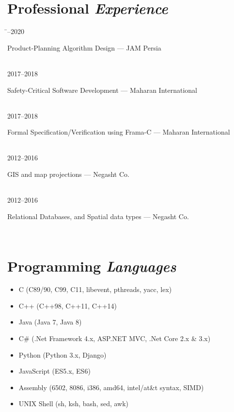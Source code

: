 \documentclass[a4paper,10pt]{article}
\newcommand{\follownote}[1]{--- {\footnotesize\color{darkblue}#1}}
\begin{document}
\section*{{\color{red}Professional \emph{Experience}}}
\begin{tabbing}
\hspace{2.5cm}\=--2020 \>\parbox[t]{10.5cm}{
	Product-Planning Algorithm Design
	\follownote{JAM Persia}
} \\[2mm]
2017--2018 \>\parbox[t]{10.5cm}{
	Safety-Critical Software Development
	\follownote{Maharan International}
} \\[2mm]
2017--2018 \>\parbox[t]{10.5cm}{
	Formal Specification/Verification using Frama-C
	\follownote{Maharan International}
} \\[2mm]
2012--2016 \>\parbox[t]{10.5cm}{
	GIS and map projections
	\follownote{Negasht Co.}
} \\[2mm]
2012--2016 \>\parbox[t]{10.5cm}{
	Relational Databases, and Spatial data types
	\follownote{Negasht Co.}
} \\[2mm]
\end{tabbing}

\section*{{\color{purple}Programming \emph{Languages}}}
\begin{itemize}
	\item C (C89/90, C99, C11, libevent, pthreads, yacc, lex)
	\item C++ (C++98, C++11, C++14)
	\item Java (Java 7, Java 8)
	\item C\# (.Net Framework 4.x, ASP.NET MVC, .Net Core 2.x \& 3.x)
	\item Python (Python 3.x, Django)
	\item JavaScript (ES5.x, ES6)
	\item Assembly (6502, 8086, i386, amd64, intel/at\&t syntax,
	    SIMD)
	\item UNIX Shell (sh, ksh, bash, sed, awk)
\end{itemize}
\end{document}
